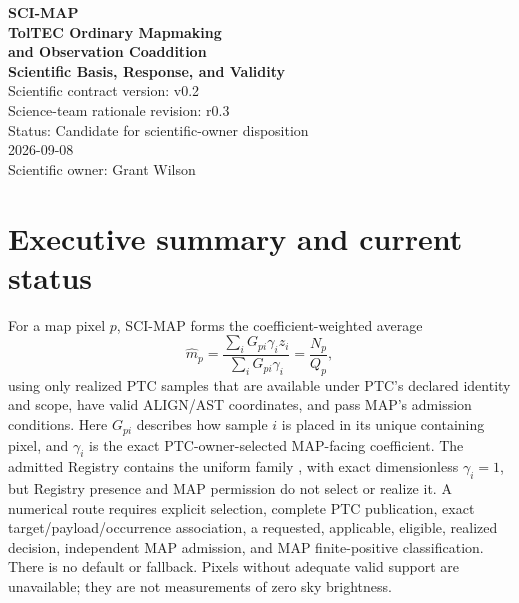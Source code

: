 \documentclass[10pt]{article}
\begin{document}
\hypersetup{pageanchor=false}
\begin{titlepage}
\centering\vspace*{0.48in}
{\Large\color{MapBlue}\textbf{SCI-MAP}}\\[0.18in]
{\huge\color{MapNavy}\textbf{TolTEC Ordinary Mapmaking}}\\[0.08in]
{\LARGE\color{MapNavy}\textbf{and Observation Coaddition}}\\[0.10in]
{\Large\color{MapBlue}\textbf{Scientific Basis, Response, and Validity}}\\[0.38in]
{\large Scientific contract version: v0.2}\\[0.06in]
{\large Science-team rationale revision: r0.3}\\[0.06in]
{\large Status: Candidate for scientific-owner disposition}\\[0.08in]
{\large 2026-09-08}\\[0.42in]

\vfill {\large Scientific owner: Grant Wilson}
\end{titlepage}
\hypersetup{pageanchor=true}

\section*{Executive summary and current status}
For a map pixel \(p\), SCI-MAP forms the coefficient-weighted average
\begin{equation}
 \widehat m_p=\frac{\sum_iG_{pi}\gamma_i z_i}
                         {\sum_iG_{pi}\gamma_i}
 =\frac{N_p}{Q_p},
 \label{eq:map}
\end{equation}
using only realized PTC samples that are available under PTC's declared
identity and scope, have valid ALIGN/AST coordinates, and pass MAP's admission
conditions. Here \(G_{pi}\) describes how
sample \(i\) is placed in its unique containing pixel, and \(\gamma_i\) is the
exact PTC-owner-selected MAP-facing coefficient. The admitted Registry contains
the uniform family \SCIMapPTCUniformFamily{}, with exact dimensionless
\(\gamma_i=1\), but Registry presence and MAP permission do not select or
realize it. A numerical route requires explicit selection, complete PTC
publication, exact target/payload/occurrence association, a requested,
applicable, eligible, realized \SCIMapPTCUniformHandoffProfile{} decision,
independent MAP admission, and MAP finite-positive classification. There is no
default or fallback. Pixels without adequate valid support are unavailable;
they are not measurements of zero sky brightness.
\end{document}
